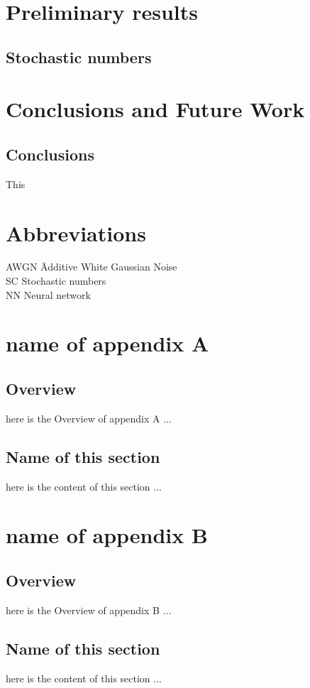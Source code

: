 \documentclass[a4paper,twoside,phd]{BYUPhys}
\begin{document}
\chapter{Preliminary results}
\section{Stochastic numbers}

\chapter{Conclusions and Future Work}
\label{chap:Conclusions}


\section{Conclusions}
\label{sec:ConclusionsConclusions}

This



\clearemptydoublepage
\chapter{Abbreviations}
\label{chap:abbreviations}

\begin{tabbing}

AWGN \qquad \qquad \= Additive White Gaussian Noise\\
SC \> Stochastic numbers\\
NN \> Neural network \\
\end{tabbing}


\appendix
\chapter{name of appendix A}
\section{Overview}
here is the Overview of appendix A ...
\section{Name of this section}
here is the content of this section ...
\chapter{name of appendix B}
\section{Overview}
here is the Overview of appendix B ...
\section{Name of this section}
here is the content of this section ...

%

%

%
\end{document}
